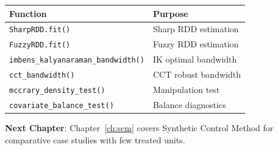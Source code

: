 \begin{center}
\begin{tabular}{ll}
\toprule
\textbf{Function} & \textbf{Purpose} \\
\midrule
\texttt{SharpRDD.fit()} & Sharp RDD estimation \\
\texttt{FuzzyRDD.fit()} & Fuzzy RDD estimation \\
\texttt{imbens\_kalyanaraman\_bandwidth()} & IK optimal bandwidth \\
\texttt{cct\_bandwidth()} & CCT robust bandwidth \\
\texttt{mccrary\_density\_test()} & Manipulation test \\
\texttt{covariate\_balance\_test()} & Balance diagnostics \\
\bottomrule
\end{tabular}
\end{center}

\vspace{1em}
\noindent\textbf{Next Chapter}: Chapter~\ref{ch:scm} covers Synthetic Control Method for comparative case studies with few treated units.
